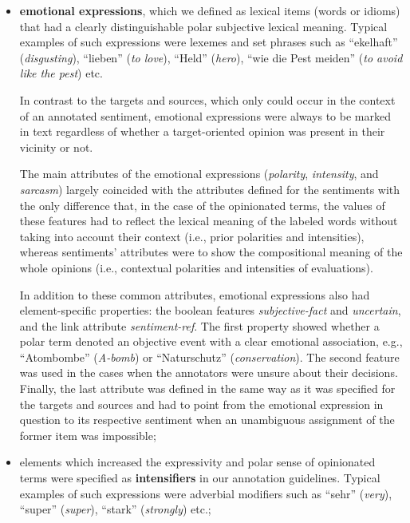 \begin{itemize}
\item
  \textbf{emotional expressions}, which we defined as lexical items
  (words or idioms) that had a clearly distinguishable polar
  subjective lexical meaning.  Typical examples of such expressions
  were lexemes and set phrases such as ``ekelhaft''
  (\emph{disgusting}), ``lieben'' (\emph{to love}), ``Held''
  (\emph{hero}), ``wie die Pest meiden'' (\emph{to avoid like the
    pest}) etc.

  In contrast to the targets and sources, which only could occur in
  the context of an annotated sentiment, emotional expressions were
  always to be marked in text regardless of whether a target-oriented
  opinion was present in their vicinity or not.

  The main attributes of the emotional expressions (\emph{polarity},
  \emph{intensity}, and \emph{sarcasm}) largely coincided with the
  attributes defined for the sentiments with the only difference that,
  in the case of the opinionated terms, the values of these features
  had to reflect the lexical meaning of the labeled words without
  taking into account their context (i.e., prior polarities and
  intensities), whereas sentiments' attributes were to show the
  compositional meaning of the whole opinions (i.e., contextual
  polarities and intensities of evaluations).

  In addition to these common attributes, emotional expressions also
  had element-specific properties: the boolean features
  \emph{subjective-fact} and \emph{uncertain}, and the link attribute
  \emph{sentiment-ref}.  The first property showed whether a polar
  term denoted an objective event with a clear emotional association,
  e.g., ``Atombombe'' (\emph{A-bomb}) or ``Naturschutz''
  (\emph{conservation}).  The second feature was used in the cases
  when the annotators were unsure about their decisions.  Finally, the
  last attribute was defined in the same way as it was specified for
  the targets and sources and had to point from the emotional
  expression in question to its respective sentiment when an
  unambiguous assignment of the former item was impossible;

\item
  elements which increased the expressivity and polar sense of
  opinionated terms were specified as \textbf{intensifiers} in our
  annotation guidelines.  Typical examples of such expressions were
  adverbial modifiers such as ``sehr'' (\emph{very}), ``super''
  (\emph{super}), ``stark'' (\emph{strongly}) etc.;


\end{itemize}
